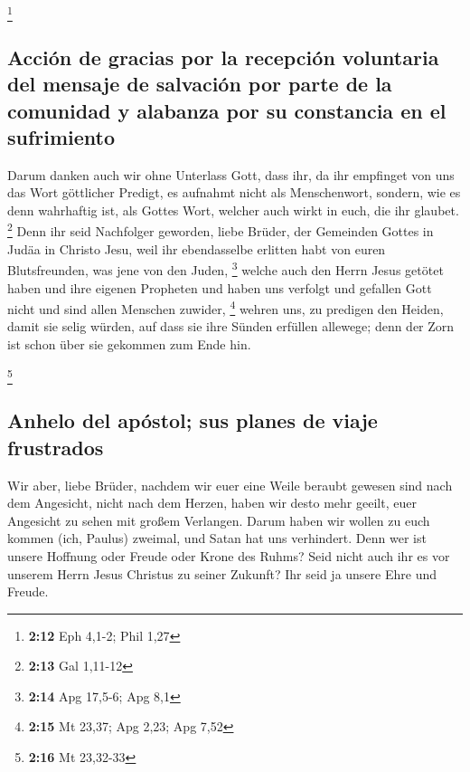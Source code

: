 \footnote{\textbf{2:12} Eph 4,1-2; Phil 1,27}

\hypertarget{acciuxf3n-de-gracias-por-la-recepciuxf3n-voluntaria-del-mensaje-de-salvaciuxf3n-por-parte-de-la-comunidad-y-alabanza-por-su-constancia-en-el-sufrimiento}{%
\subsection{Acción de gracias por la recepción voluntaria del mensaje de
salvación por parte de la comunidad y alabanza por su constancia en el
sufrimiento}\label{acciuxf3n-de-gracias-por-la-recepciuxf3n-voluntaria-del-mensaje-de-salvaciuxf3n-por-parte-de-la-comunidad-y-alabanza-por-su-constancia-en-el-sufrimiento}}

 Darum danken auch wir ohne Unterlass Gott, dass ihr, da
ihr empfinget von uns das Wort göttlicher Predigt, es aufnahmt nicht als
Menschenwort, sondern, wie es denn wahrhaftig ist, als Gottes Wort,
welcher auch wirkt in euch, die ihr glaubet. \footnote{\textbf{2:13} Gal
  1,11-12}  Denn ihr seid Nachfolger geworden, liebe
Brüder, der Gemeinden Gottes in Judäa in Christo Jesu, weil ihr
ebendasselbe erlitten habt von euren Blutsfreunden, was jene von den
Juden, \footnote{\textbf{2:14} Apg 17,5-6; Apg 8,1} 
welche auch den Herrn Jesus getötet haben und ihre eigenen Propheten und
haben uns verfolgt und gefallen Gott nicht und sind allen Menschen
zuwider, \footnote{\textbf{2:15} Mt 23,37; Apg 2,23; Apg 7,52}
 wehren uns, zu predigen den Heiden, damit sie selig
würden, auf dass sie ihre Sünden erfüllen allewege; denn der Zorn ist
schon über sie gekommen zum Ende hin.

\footnote{\textbf{2:16} Mt 23,32-33}

\hypertarget{anhelo-del-apuxf3stol-sus-planes-de-viaje-frustrados}{%
\subsection{Anhelo del apóstol; sus planes de viaje
frustrados}\label{anhelo-del-apuxf3stol-sus-planes-de-viaje-frustrados}}

 Wir aber, liebe Brüder, nachdem wir euer eine Weile
beraubt gewesen sind nach dem Angesicht, nicht nach dem Herzen, haben
wir desto mehr geeilt, euer Angesicht zu sehen mit großem Verlangen.
 Darum haben wir wollen zu euch kommen (ich, Paulus)
zweimal, und Satan hat uns verhindert.  Denn wer ist
unsere Hoffnung oder Freude oder Krone des Ruhms? Seid nicht auch ihr es
vor unserem Herrn Jesus Christus zu seiner Zukunft?  Ihr
seid ja unsere Ehre und Freude.

